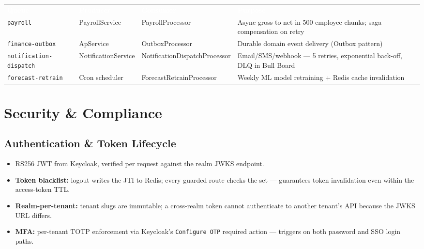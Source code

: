 \documentclass[11pt,a4paper]{article}
\newcommand{\code}[1]{\texttt{\small #1}}
\begin{document}
\begin{table}[H]
\centering\small
\renewcommand{\arraystretch}{1.25}
\begin{tabularx}{\textwidth}{l l l X}
\toprule
\rowcolor{amdoxnavy}
\textcolor{white}{\textbf{Queue}} &
\textcolor{white}{\textbf{Producer}} &
\textcolor{white}{\textbf{Consumer}} &
\textcolor{white}{\textbf{Purpose}} \\
\code{payroll} & PayrollService & PayrollProcessor &
  Async gross-to-net in 500-employee chunks; saga compensation on retry \\
\rowcolor{amdoxlight}
\code{finance-outbox} & ApService & OutboxProcessor &
  Durable domain event delivery (Outbox pattern) \\
\code{notification-dispatch} & NotificationService & NotificationDispatchProcessor &
  Email/SMS/webhook --- 5 retries, exponential back-off, DLQ in Bull Board \\
\rowcolor{amdoxlight}
\code{forecast-retrain} & Cron scheduler & ForecastRetrainProcessor &
  Weekly ML model retraining + Redis cache invalidation \\
\bottomrule
\end{tabularx}
\end{table}

\section{Security \& Compliance}\label{sec:security}

\subsection{Authentication \& Token Lifecycle}

\begin{itemize}
  \item RS256 JWT from Keycloak, verified per request against the realm JWKS endpoint.
  \item \textbf{Token blacklist:} logout writes the JTI to Redis; every guarded route
  checks the set --- guarantees token invalidation even within the access-token TTL.
  \item \textbf{Realm-per-tenant:} tenant slugs are immutable; a cross-realm token
  cannot authenticate to another tenant's API because the JWKS URL differs.
  \item \textbf{MFA:} per-tenant TOTP enforcement via Keycloak's
  \code{Configure~OTP} required action --- triggers on both password and SSO login paths.
\end{itemize}
\end{document}
